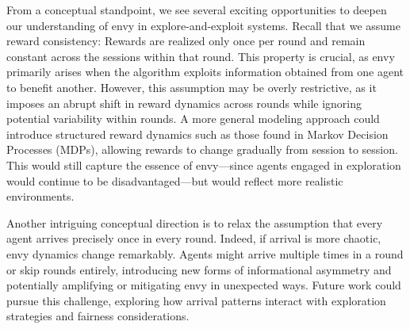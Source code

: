 From a conceptual standpoint, we see several exciting opportunities to deepen our understanding of envy in explore-and-exploit systems. Recall that we assume reward consistency: Rewards are realized only once per round and remain constant across the sessions within that round. This property is crucial, as envy primarily arises when the algorithm exploits information obtained from one agent to benefit another. However, this assumption may be overly restrictive, as it imposes an abrupt shift in reward dynamics across rounds while ignoring potential variability within rounds. A more general modeling approach could introduce structured reward dynamics such as those found in Markov Decision Processes (MDPs), allowing rewards to change gradually from session to session. This would still capture the essence of envy---since agents engaged in exploration would continue to be disadvantaged---but would reflect more realistic environments. 

Another intriguing conceptual direction is to relax the assumption that every agent arrives precisely once in every round. Indeed, if arrival is more chaotic, envy dynamics change remarkably. Agents might arrive multiple times in a round or skip rounds entirely, introducing new forms of informational asymmetry and potentially amplifying or mitigating envy in unexpected ways. Future work could pursue this challenge, exploring how arrival patterns interact with exploration strategies and fairness considerations. %
